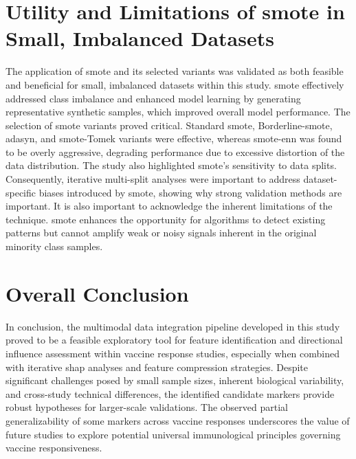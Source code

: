 \documentclass[12pt,a4paper]{report}
\begin{document}
\section{Utility and Limitations of \acrshort{smote} in Small, Imbalanced Datasets}
\noindent
The application of \acrshort{smote} and its selected variants was validated as both feasible and beneficial for small, imbalanced datasets within this study. \acrshort{smote} effectively addressed class imbalance and enhanced model learning by generating representative synthetic samples, which improved overall model performance. The selection of \acrshort{smote} variants proved critical. Standard \acrshort{smote}, Borderline-\acrshort{smote}, \acrshort{adasyn}, and \acrshort{smote}-Tomek variants were effective, whereas \acrshort{smote}-\acrshort{enn} was found to be overly aggressive, degrading performance due to excessive distortion of the data distribution. The study also highlighted \acrshort{smote}'s sensitivity to data splits. Consequently, iterative multi-split analyses were important to address dataset-specific biases introduced by \acrshort{smote}, showing why strong validation methods are important. It is also important to acknowledge the inherent limitations of the technique. \acrshort{smote} enhances the opportunity for algorithms to detect existing patterns but cannot amplify weak or noisy signals inherent in the original minority class samples.

\section{Overall Conclusion}
\noindent
In conclusion, the multimodal data integration pipeline developed in this study proved to be a feasible exploratory tool for feature identification and directional influence assessment within vaccine response studies, especially when combined with iterative \acrshort{shap} analyses and feature compression strategies. Despite significant challenges posed by small sample sizes, inherent biological variability, and cross-study technical differences, the identified candidate markers provide robust hypotheses for larger-scale validations. The observed partial generalizability of some markers across vaccine responses underscores the value of future studies to explore potential universal immunological principles governing vaccine responsiveness.


\end{document}

